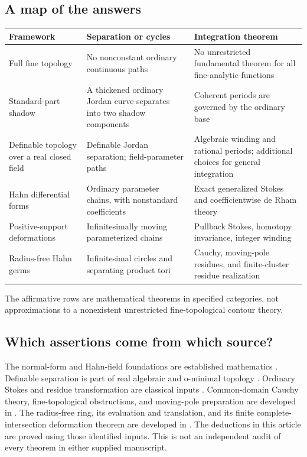 \documentclass[11pt,letterpaper]{article}
\theoremstyle{definition}
\theoremstyle{remark}
\numberwithin{equation}{section}
\begin{document}
\subsection{A map of the answers}
\begin{center}\small
\begin{tabular}{@{}L{0.23\textwidth}L{0.32\textwidth}L{0.35\textwidth}@{}}
\toprule
Framework & Separation or cycles & Integration theorem\\
\midrule
Full fine topology & No nonconstant ordinary continuous paths & No unrestricted fundamental theorem for all fine-analytic functions\\[0.45em]
Standard-part shadow & A thickened ordinary Jordan curve separates into two shadow components & Coherent periods are governed by the ordinary base\\[0.45em]
Definable topology over a real closed field & Definable Jordan separation; field-parameter paths & Algebraic winding and rational periods; additional choices for general integration\\[0.45em]
Hahn differential forms & Ordinary parameter chains, with nonstandard coefficients & Exact generalized Stokes and coefficientwise de Rham theory\\[0.45em]
Positive-support deformations & Infinitesimally moving parameterized chains & Pullback Stokes, homotopy invariance, integer winding\\[0.45em]
Radius-free Hahn germs & Infinitesimal circles and separating product tori & Cauchy, moving-pole residues, and finite-cluster residue realization\\
\bottomrule
\end{tabular}
\end{center}
The affirmative rows are mathematical theorems in specified categories, not approximations to a nonexistent unrestricted fine-topological contour theory.

\subsection{Which assertions come from which source?}
The normal-form and Hahn-field foundations are established mathematics \cite{Poonen,Neumann}. Definable separation is part of real algebraic and o-minimal topology \cite{BO}. Ordinary Stokes and residue transformation are classical inputs \cite{GH,CDS}. Common-domain Cauchy theory, fine-topological obstructions, and moving-pole preparation are developed in \cite{SA}. The radius-free ring, its evaluation and translation, and its finite complete-intersection deformation theorem are developed in \cite{AG}. The deductions in this article are proved using those identified inputs. This is not an independent audit of every theorem in either supplied manuscript.
\end{document}
